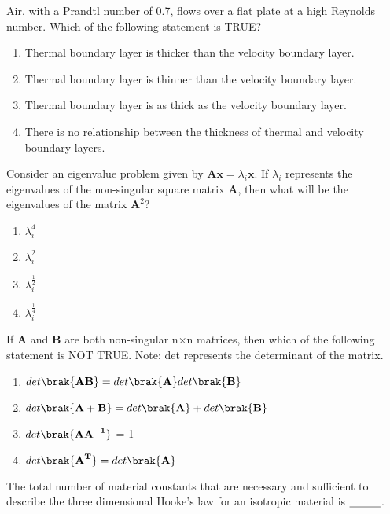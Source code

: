 \item Air, with a Prandtl number of 0.7, flows over a flat plate at a high Reynolds number. Which of the following statement is TRUE?
\begin{enumerate}
    \item Thermal boundary layer is thicker than the velocity boundary layer.
    \item Thermal boundary layer is thinner than the velocity boundary layer.
    \item Thermal boundary layer is as thick as the velocity boundary layer.
    \item There is no relationship between the thickness of thermal and velocity boundary layers.
\end{enumerate}

\item Consider an eigenvalue problem given by $\textbf{Ax} = {\lambda_i}\textbf{x}$. If $\lambda_i$ represents the eigenvalues of the non-singular square matrix $\textbf{A}$, then what will be the eigenvalues of the matrix $\textbf{A}^2$?
\begin{enumerate}
   \item $\lambda_i^4$
    \item $\lambda_i^2$
    \item $\lambda_i^{\frac{1}{2}}$
    \item $\lambda_i^{\frac{1}{4}}$
\end{enumerate}

\item If $\textbf{A}$ and $\textbf{B}$ are both non-singular n$\times$n matrices, then which of the following statement is NOT TRUE. Note: det represents the determinant of the matrix.
\begin{enumerate}
    \item $det\brak{\textbf{AB}} = det\brak{\textbf{A}}det\brak{\textbf{B}}$
    \item $det\brak{\textbf{A}+\textbf{B}} = det \brak{\textbf{A}} + det \brak{\textbf{B}}$
    \item $det\brak{\textbf{AA}^{-\textbf{1}}}$ = 1
    \item $det\brak{\textbf{A}^{\textbf{T}}} = det\brak{\textbf{A}}$
\end{enumerate}

\item The total number of material constants that are necessary and sufficient to describe the three dimensional Hooke's law for an isotropic material is $\makebox[1cm][l]{\underline{\hspace{1cm}}}$.

